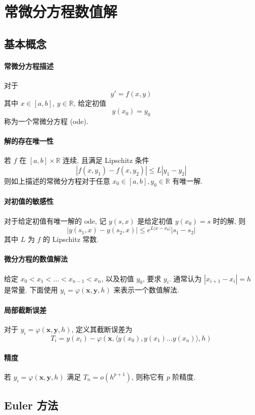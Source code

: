 \documentclass{ctexart}
\newcommand{\Rset}{\mathbb{R}}
\begin{document}
\section{常微分方程数值解}
\subsection{基本概念}
\paragraph{常微分方程描述}
    对于 \[
        y' = f(x, y) \]
    其中 $x \in [a,b]$, $y \in \Rset$,
    给定初值 \[
        y(x_0) = y_0 \]
    称为一个常微分方程 (ode).
\paragraph{解的存在唯一性}
    若 $f$ 在 $[a, b] \times \Rset$ 连续, 且满足 Lipschitz 条件 \[
        |f(x, y_1) - f(x, y_2)| \le L | y_1 - y_2|\]
    则如上描述的常微分方程对于任意 $x_0 \in [a,b], y_0 \in \Rset$ 有唯一解.
\paragraph{对初值的敏感性}
    对于给定初值有唯一解的 ode, 记 $y(s, x)$ 是给定初值 $y(x_0) = s$ 时的解,
    则 \[ |y(s_1, x) - y(s_2, x)| \le e^{L |x - x_0|} |s_1 - s_2| \]
    其中 $L$ 为 $f$ 的 Lipschitz 常数.
\paragraph{微分方程的数值解法}
    给定 $x_0 < x_1 < \ldots < x_{n-1} < x_n$, 以及初值 $y_0$, 要求
    $y_i$. 通常认为 $|x_{i+1} - x_i| = h$ 是常量.
    下面使用 $y_i = \varphi(\mathbf{x}, \mathbf{y}, h)$ 来表示一个数值解法.
\paragraph{局部截断误差}
    对于 $y_i = \varphi(\mathbf{x}, \mathbf{y}, h)$, 定义其截断误差为 \[
        T_i = y(x_i) - \varphi(\mathbf{x}, \langle y(x_0), y(x_1) \ldots y(x_n) \rangle, h) \]
\paragraph{精度}
    若 $y_i = \varphi(\mathbf{x}, \mathbf{y}, h)$ 满足 $T_n = o(h^{p+1})$,
    则称它有 $p$ 阶精度.

\subsection{Euler 方法}
\end{document}
